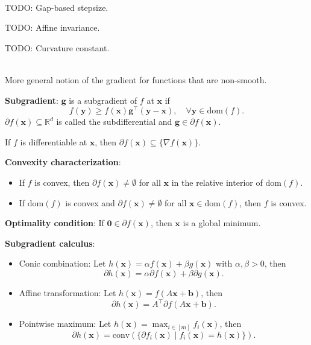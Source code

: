 \documentclass{article}
\newcommand{\R}{\mathbb{R}}
\renewcommand{\vec}[1]{\mathbf{#1}}
\newcommand{\mat}[1]{#1}
\newcommand{\transpose}[1]{#1^\top}
\newcommand{\dom}[1]{\mathrm{dom}(#1)}
\newenvironment{topic}[1]
{\textbf{\sffamily \colorbox{black}{\rlap{\textbf{\textcolor{white}{#1}}}\hspace{\linewidth}\hspace{-2\fboxsep}}} \\ \vspace{0.2cm}}
{}
\begin{document}
\begin{multicols*}{2}
\begin{topic}{7 The Frank-Wolfe algorithm}
        TODO: Gap-based stepsize.

        TODO: Affine invariance.

        TODO: Curvature constant.

    \end{topic}

    \begin{topic}{Subgradient method}
        More general notion of the gradient for functions that are non-smooth.

        \textbf{Subgradient}: $\vec{g}$ is a subgradient of $f$ at $\vec{x}$ if \[
            f(\vec{y}) \geq f(\vec{x}) \transpose{\vec{g}} (\vec{y} - \vec{x}), \quad \forall \vec{y} \in \dom{f}.
        \]
        $\partial f(\vec{x}) \subseteq \R^d$ is called the subdifferential and $\vec{g} \in \partial f(\vec{x})$.

        If $f$ is differentiable at $\vec{x}$, then $\partial f(\vec{x}) \subseteq \{ \nabla f(\vec{x})
            \}$.

        \textbf{Convexity characterization}:
        \begin{itemize}
            \item If $f$ is convex, then $\partial f(\vec{x}) \neq \emptyset$ for all $\vec{x}$ in the relative
                  interior of $\dom{f}$.
            \item If $\dom{f}$ is convex and $\partial f(\vec{x}) \neq \emptyset$ for all $\vec{x} \in \dom{f}$, then
                  $f$ is convex.
        \end{itemize}

        \textbf{Optimality condition}: If $\vec{0} \in \partial f(\vec{x})$, then $\vec{x}$ is a global minimum.

        \textbf{Subgradient calculus}:
        \begin{itemize}
            \item Conic combination: Let $h(\vec{x}) = \alpha f(\vec{x}) + \beta g(\vec{x})$ with $\alpha, \beta >
                      0$, then \[
                      \partial h(\vec{x}) = \alpha \partial f(\vec{x}) + \beta \partial g(\vec{x}).
                  \]
            \item Affine transformation: Let $h(\vec{x}) = f(\mat{A} \vec{x} + \vec{b})$, then \[
                      \partial h(\vec{x}) = \transpose{\mat{A}} \partial f(\mat{A} \vec{x} + \vec{b}).
                  \]
            \item Pointwise maximum: Let $h(\vec{x}) = \max_{i \in [m]} f_i(\vec{x})$, then \[
                      \partial h(\vec{x}) = \mathrm{conv}(\{ \partial f_i(\vec{x}) \mid f_i(\vec{x}) = h(\vec{x}) \}).
                  \]
        \end{itemize}


\end{topic}
\end{multicols*}
\end{document}
